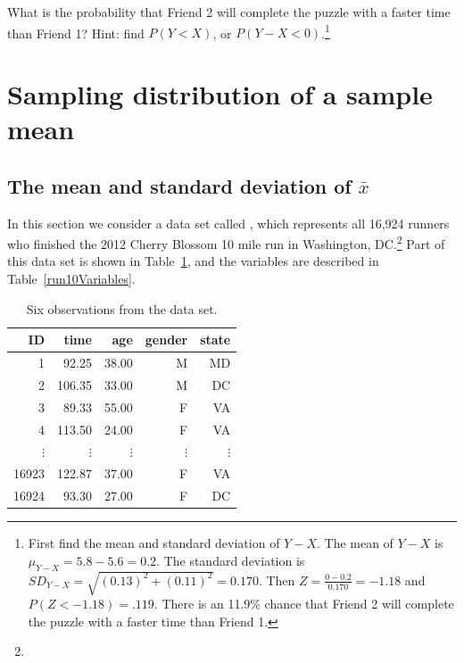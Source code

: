 \begin{exercise}
What is the probability that Friend 2 will complete the puzzle with a faster time than Friend 1?  Hint:  find $P(Y < X)$, or $P(Y - X < 0)$.\footnote{First find the mean and standard deviation of $Y - X$. The mean of $Y - X$ is $\mu_{Y-X} = 5.8 - 5.6 =  0.2$. The standard deviation is  $SD_{Y-X}=\sqrt{(0.13)^2+(0.11)^2}=0.170$. Then $Z=\frac{0-0.2}{0.170}=-1.18$ and $P(Z < -1.18)= .119$. There is an 11.9\% chance that Friend 2 will complete the puzzle with a faster time than Friend 1.}
\end{exercise}


\section{Sampling distribution of a sample mean}
\label{distributionofxbar}

\subsection{The mean and standard deviation of $\bar{x}$}


In this section we consider a data set called , which represents all 16,924 runners who finished the 2012 Cherry Blossom 10 mile run in Washington, DC.\footnote{} Part of this data set is shown in Table~\ref{run10DF}, and the variables are described in Table~\ref{run10Variables}.

\begin{table}[h]
\centering
\begin{tabular}{rrrrr}
  \hline
ID & time & age & gender & state \\ 
  \hline
1 & 92.25 & 38.00 & M & MD \\ 
2 & 106.35 & 33.00 & M & DC \\ 
3 & 89.33 & 55.00 & F & VA \\ 
4 & 113.50 & 24.00 & F & VA \\ 
$\vdots$ & $\vdots$ & $\vdots$ & $\vdots$ & $\vdots$ \\
16923 & 122.87 & 37.00 & F & VA \\ 
16924 & 93.30 & 27.00 & F & DC \\ 
   \hline
\end{tabular}
\caption{Six observations from the  data set.}
\label{run10DF}
\end{table}

